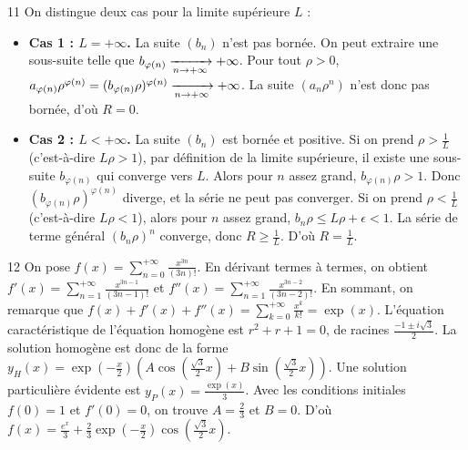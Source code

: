 \begin{correction}{11}
On distingue deux cas pour la limite supérieure $L$ : 
\begin{itemize}
 \item \textbf{Cas 1 : $L = +\infty$.} La suite $(b_n)$ n'est pas bornée. On peut extraire une sous-suite telle que $b_{\varphi(n)} \xrightarrow[n \to +\infty]{} +\infty$. 
 Pour tout $\rho > 0$, $a_{\varphi(n)}\rho^{\varphi(n)} = (b_{\varphi(n)}\rho)^{\varphi(n)} \xrightarrow[n \to +\infty]{} +\infty$. La suite $(a_n\rho^n)$ n'est donc pas bornée, d'où $R=0$. 
 \item \textbf{Cas 2 : $L < +\infty$.} La suite $(b_n)$ est bornée et positive. 
 Si on prend $\rho > \frac{1}{L}$ (c'est-à-dire $L\rho > 1$), par définition de la limite supérieure, il existe une sous-suite $b_{\varphi(n)}$ qui converge vers $L$. Alors pour $n$ assez grand, $b_{\varphi(n)}\rho > 1$. Donc $(b_{\varphi(n)}\rho)^{\varphi(n)}$ diverge, et la série ne peut pas converger. 
 Si on prend $\rho < \frac{1}{L}$ (c'est-à-dire $L\rho < 1$), alors pour $n$ assez grand, $b_n \rho \le L\rho + \epsilon < 1$. La série de terme général $(b_n \rho)^n$ converge, donc $R \ge \frac{1}{L}$. 
 D'où $R = \frac{1}{L}$. 
\end{itemize}
\end{correction}

\begin{correction}{12}
On pose $f(x) = \sum_{n=0}^{+\infty} \frac{x^{3n}}{(3n)!}$. 
En dérivant termes à termes, on obtient $f'(x) = \sum_{n=1}^{+\infty} \frac{x^{3n-1}}{(3n-1)!}$ et $f''(x) = \sum_{n=1}^{+\infty} \frac{x^{3n-2}}{(3n-2)!}$. 
En sommant, on remarque que $f(x) + f'(x) + f''(x) = \sum_{k=0}^{+\infty} \frac{x^k}{k!} = \exp(x)$. 
L'équation caractéristique de l'équation homogène est $r^2+r+1=0$, de racines $\frac{-1 \pm i\sqrt{3}}{2}$. 
La solution homogène est donc de la forme $y_H(x) = \exp\left(-\frac{x}{2}\right) \left(A \cos\left(\frac{\sqrt{3}}{2}x\right) + B \sin\left(\frac{\sqrt{3}}{2}x\right)\right)$. 
Une solution particulière évidente est $y_P(x) = \frac{\exp(x)}{3}$. 
Avec les conditions initiales $f(0)=1$ et $f'(0)=0$, on trouve $A = \frac{2}{3}$ et $B = 0$. 
D'où $f(x) = \frac{e^x}{3} + \frac{2}{3}\exp\left(-\frac{x}{2}\right)\cos\left(\frac{\sqrt{3}}{2}x\right)$. 
\end{correction}

